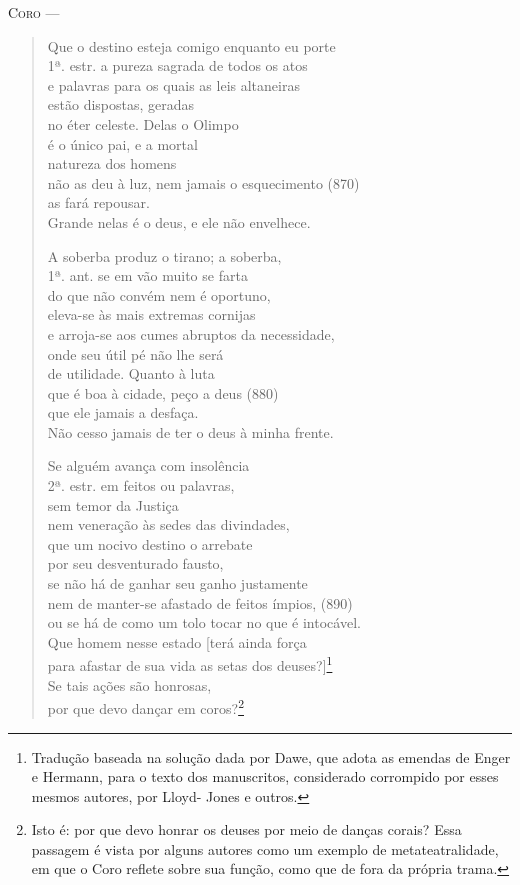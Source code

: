 \textsc{Coro} --- \begin{verse}Que o destino esteja comigo enquanto eu porte\\ 1ª. estr.
a pureza sagrada de todos os atos\\
e palavras para os quais as leis altaneiras\\
estão dispostas, geradas\\
no éter celeste. Delas o Olimpo\\
é o único pai, e a mortal\\
natureza dos homens\\
não as deu à luz, nem jamais o esquecimento (870)\\
as fará repousar.\\
Grande nelas é o deus, e ele não envelhece.

A soberba produz o tirano; a soberba,\\ 1ª. ant.
se em vão muito se farta\\
do que não convém nem é oportuno,\\
eleva-se às mais extremas cornijas\\
e arroja-se aos cumes abruptos da necessidade,\\
onde seu útil pé não lhe será\\
de utilidade. Quanto à luta\\
que é boa à cidade, peço a deus (880)\\
que ele jamais a desfaça.\\
Não cesso jamais de ter o deus à minha frente.

Se alguém avança com insolência\\ 2ª. estr.
em feitos ou palavras,\\
sem temor da Justiça\\
nem veneração às sedes das divindades,\\
que um nocivo destino o arrebate\\
por seu desventurado fausto,\\
se não há de ganhar seu ganho justamente\\
nem de manter-se afastado de feitos ímpios, (890)\\
ou se há de como um tolo tocar no que é intocável.\\
Que homem nesse estado {[}terá ainda força\\
para afastar de sua vida as setas dos deuses?{]}\footnote{Tradução
baseada na solução dada por Dawe, que adota as emendas de Enger e
Hermann, para o texto dos manuscritos, considerado corrompido por
esses mesmos autores, por Lloyd- Jones e outros.}\\
Se tais ações são honrosas,\\
por que devo dançar em coros?\footnote{Isto é: por que devo honrar os
  deuses por meio de danças corais? Essa passagem é vista por alguns
  autores como um exemplo de metateatralidade, em que o Coro reflete
  sobre sua função, como que de fora da própria trama.}


\end{verse}
